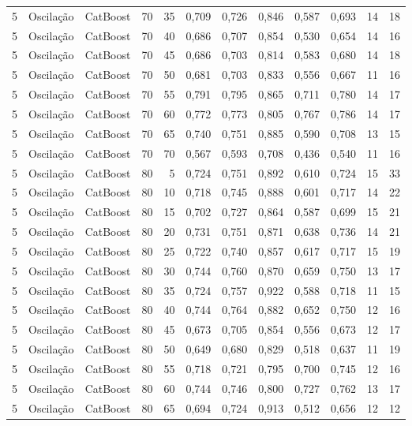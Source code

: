 \begin{longtable}{@{}rllrrrrrrrrr@{}}
5 & Oscilação & CatBoost & 70 & 35 & 0,709 & 0,726 & 0,846 & 0,587 & 0,693 & 14 & 18 \\
5 & Oscilação & CatBoost & 70 & 40 & 0,686 & 0,707 & 0,854 & 0,530 & 0,654 & 14 & 16 \\
5 & Oscilação & CatBoost & 70 & 45 & 0,686 & 0,703 & 0,814 & 0,583 & 0,680 & 14 & 18 \\
5 & Oscilação & CatBoost & 70 & 50 & 0,681 & 0,703 & 0,833 & 0,556 & 0,667 & 11 & 16 \\
5 & Oscilação & CatBoost & 70 & 55 & 0,791 & 0,795 & 0,865 & 0,711 & 0,780 & 14 & 17 \\
5 & Oscilação & CatBoost & 70 & 60 & 0,772 & 0,773 & 0,805 & 0,767 & 0,786 & 14 & 17 \\
5 & Oscilação & CatBoost & 70 & 65 & 0,740 & 0,751 & 0,885 & 0,590 & 0,708 & 13 & 15 \\
5 & Oscilação & CatBoost & 70 & 70 & 0,567 & 0,593 & 0,708 & 0,436 & 0,540 & 11 & 16 \\
5 & Oscilação & CatBoost & 80 & 5 & 0,724 & 0,751 & 0,892 & 0,610 & 0,724 & 15 & 33 \\
5 & Oscilação & CatBoost & 80 & 10 & 0,718 & 0,745 & 0,888 & 0,601 & 0,717 & 14 & 22 \\
5 & Oscilação & CatBoost & 80 & 15 & 0,702 & 0,727 & 0,864 & 0,587 & 0,699 & 15 & 21 \\
5 & Oscilação & CatBoost & 80 & 20 & 0,731 & 0,751 & 0,871 & 0,638 & 0,736 & 14 & 21 \\
5 & Oscilação & CatBoost & 80 & 25 & 0,722 & 0,740 & 0,857 & 0,617 & 0,717 & 15 & 19 \\
5 & Oscilação & CatBoost & 80 & 30 & 0,744 & 0,760 & 0,870 & 0,659 & 0,750 & 13 & 17 \\
5 & Oscilação & CatBoost & 80 & 35 & 0,724 & 0,757 & 0,922 & 0,588 & 0,718 & 11 & 15 \\
5 & Oscilação & CatBoost & 80 & 40 & 0,744 & 0,764 & 0,882 & 0,652 & 0,750 & 12 & 16 \\
5 & Oscilação & CatBoost & 80 & 45 & 0,673 & 0,705 & 0,854 & 0,556 & 0,673 & 12 & 17 \\
5 & Oscilação & CatBoost & 80 & 50 & 0,649 & 0,680 & 0,829 & 0,518 & 0,637 & 11 & 19 \\
5 & Oscilação & CatBoost & 80 & 55 & 0,718 & 0,721 & 0,795 & 0,700 & 0,745 & 12 & 16 \\
5 & Oscilação & CatBoost & 80 & 60 & 0,744 & 0,746 & 0,800 & 0,727 & 0,762 & 13 & 17 \\
5 & Oscilação & CatBoost & 80 & 65 & 0,694 & 0,724 & 0,913 & 0,512 & 0,656 & 12 & 12 \\

\end{longtable}
